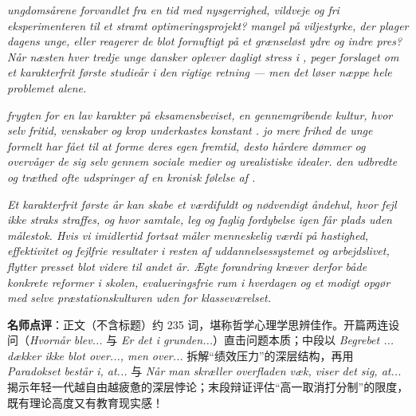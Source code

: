 \begin{answerbox}
\textit{ ungdomsårene forvandlet fra en tid med nysgerrighed, vildveje og fri eksperimenteren til et stramt optimeringsprojekt?  mangel på viljestyrke, der plager dagens unge, eller reagerer de blot fornuftigt på et grænseløst ydre og indre pres? Når næsten hver tredje unge dansker oplever dagligt stress i , peger forslaget om et karakterfrit første studieår i den rigtige retning --- men det løser næppe hele problemet alene.}

\textit{ frygten for en lav karakter på eksamensbeviset,  en gennemgribende kultur, hvor selv fritid, venskaber og krop underkastes konstant .  jo mere frihed de unge formelt har fået til at forme deres egen fremtid, desto hårdere dømmer og overvåger de sig selv gennem sociale medier og urealistiske idealer.  den udbredte  og træthed ofte udspringer af en kronisk følelse af .}

\textit{Et karakterfrit første år kan skabe et værdifuldt og nødvendigt åndehul, hvor fejl ikke straks straffes, og hvor samtale, leg og faglig fordybelse igen får plads uden målestok. Hvis vi imidlertid fortsat måler menneskelig værdi på hastighed, effektivitet og fejlfrie resultater i resten af uddannelsessystemet og arbejdslivet, flytter presset blot videre til andet år. Ægte forandring kræver derfor både konkrete reformer i skolen, evalueringsfrie rum i hverdagen og et modigt opgør med selve præstationskulturen uden for klasseværelset.}

\small\textbf{名师点评}：正文（不含标题）约 235 词，堪称哲学心理学思辨佳作。开篇两连设问（\textit{Hvornår blev...} 与 \textit{Er det i grunden...}）直击问题本质；中段以 \textit{Begrebet ... dækker ikke blot over..., men over...} 拆解“绩效压力”的深层结构，再用 \textit{Paradokset består i, at...} 与 \textit{Når man skræller overfladen væk, viser det sig, at...} 揭示年轻一代越自由越疲惫的深层悖论；末段辩证评估“高一取消打分制”的限度，既有理论高度又有教育现实感！
\end{answerbox}